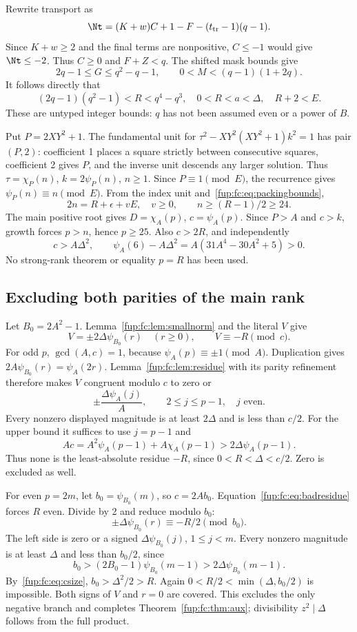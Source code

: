 \documentclass[11pt,letterpaper]{article}
\theoremstyle{definition}\newtheorem{definition}[theorem]{Definition}
\theoremstyle{remark}\newtheorem{remark}[theorem]{Remark}
\newcommand{\D}{\Delta}
\newcommand{\ch}[2]{\chi_{#1}(#2)}\newcommand{\ps}[2]{\psi_{#1}(#2)}
\begin{document}
Rewrite transport as
\[
 \Nt=(K+w)C+1-F-(t_{\rm tr}-1)(q-1).
\]
Since $K+w\ge2$ and the final terms are nonpositive, $C\le-1$ would
give $\Nt\le-2$. Thus $C\ge0$ and $F+Z<q$. The shifted mask bounds give
\[
 2q-1\le G\le q^2-q-1,\qquad
 0<M<(q-1)(1+2q).
\]
It follows directly that
\begin{equation}
 (2q-1)(q^2-1)<R<q^4-q^3,\quad
 0<R<a<\D,\quad R+2<E.\label{fup:fc:eq:packingbounds}
\end{equation}
These are untyped integer bounds: $q$ has not been assumed even or a power
of $B$.

Put $P=2XY^2+1$. The fundamental unit for
$\tau^2-XY^2(XY^2+1)k^2=1$ has pair $(P,2)$: coefficient 1 places a
square strictly between consecutive squares, coefficient 2 gives $P$,
and the inverse unit descends any larger solution. Thus
$\tau=\ch P n$, $k=2\ps P n$, $n\ge1$.
Since $P\equiv1\pmod E$, the recurrence gives $\ps P n\equiv n\pmod E$.
From the index unit and~\eqref{fup:fc:eq:packingbounds},
\[
 2n=R+\epsilon+vE,\quad v\ge0,\qquad n\ge(R-1)/2\ge24.
\]
The main positive root gives $D=\ch A p$, $c=\ps A p$.
Since $P>A$ and $c>k$, growth forces $p>n$, hence $p\ge25$.
Also $c>2R$, and independently
\begin{equation}
 c>A\D^2,\qquad
 \ps A6-A\D^2=A(31A^4-30A^2+5)>0.\label{fup:fc:eq:csize}
\end{equation}
No strong-rank theorem or equality $p=R$ has been used.

\subsection{Excluding both parities of the main rank}
Let $B_0=2A^2-1$. Lemma~\ref{fup:fc:lem:smallnorm} and the literal $V$ give
\begin{equation}
 V=\pm2\D\ps {B_0}r\quad(r\ge0),\qquad V\equiv-R\pmod c.\label{fup:fc:eq:badresidue}
\end{equation}
For odd $p$, $\gcd(A,c)=1$, because $\ps A p\equiv\pm1\pmod A$.
Duplication gives $2A\ps {B_0}r=\ps A{2r}$.
Lemma~\ref{fup:fc:lem:residue} with its parity refinement therefore makes $V$
congruent modulo $c$ to zero or
\[
 \pm\frac{\D\ps A j}{A},\qquad 2\le j\le p-1,\quad j\text{ even}.
\]
Every nonzero displayed magnitude is at least $2\D$ and is less than
$c/2$. For the upper bound it suffices to use $j=p-1$ and
\[
 Ac=A^2\ps A{p-1}+A\ch A{p-1}>2\D\ps A{p-1}.
\]
Thus none is the least-absolute residue $-R$, since
$0<R<\D<c/2$. Zero is excluded as well.

For even $p=2m$, let $b_0=\ps {B_0}m$, so $c=2Ab_0$.
Equation~\eqref{fup:fc:eq:badresidue} forces $R$ even. Divide by 2 and reduce
modulo $b_0$:
\[
 \pm\D\ps {B_0}r\equiv-R/2\pmod{b_0}.
\]
The left side is zero or a signed $\D\ps {B_0}j$, $1\le j<m$.
Every nonzero magnitude is at least $\D$ and less than $b_0/2$, since
\[
 b_0>(2B_0-1)\ps {B_0}{m-1}>2\D\ps {B_0}{m-1}.
\]
By~\eqref{fup:fc:eq:csize}, $b_0>\D^2/2>R$. Again
$0<R/2<\min(\D,b_0/2)$ is impossible. Both signs of $V$ and $r=0$
are covered. This excludes the only negative branch and completes
Theorem~\ref{fup:fc:thm:aux}; divisibility $z^2\mid\D$ follows from the full product.
\end{document}
